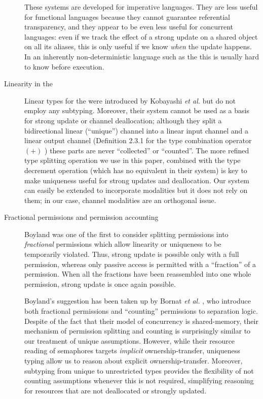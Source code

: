 \documentclass[copyright]{eptcs}
\begin{document}
\begin{description}
These systems are developed for imperative languages. They are less useful for
functional languages because they cannot guarantee referential transparency,
and they appear to be even less useful for concurrent languages: even if we track the effect
of a strong update on a shared object on all its aliases, this is only useful
if we know \textit{when} the update happens. In an inherently non-deterministic
language such as the \pic this is usually hard to know before execution. 

\item[Linearity in the \pic]

Linear types for the \pic were introduced by Kobayashi \textit{et al.}
\cite{KobayashiPT:linearity} but do not employ any subtyping.  Moreover, their
system cannot be used as a basis for strong update or channel deallocation;
although they  split a bidirectional linear (``unique'') channel into
a linear input channel and a linear output channel (\cf Definition 2.3.1 for the
type combination operator $(+)$ ) these parts are never
``collected'' or ``counted''. The more refined type splitting operation we use in this paper,
combined with the type decrement operation (which has no equivalent in their
system) is key to make uniqueness useful for strong updates and deallocation.
Our system can easily be extended to incorporate modalities but it does not
rely on them; in our case, channel modalities are an orthogonal issue.

\item[Fractional permissions and permission accounting]

Boyland \cite{boyland:03fractions} was one of the first to consider splitting
permissions into \textit{fractional} permissions which allow linearity or
uniqueness to be temporarily violated. Thus, strong update is possible only
with a full permission, whereas only passive access is permitted with a
``fraction'' of a permission.  When all the fractions have been reassembled
into one whole permission, strong update is once again possible.

Boyland's suggestion has been taken up by Bornat \textit{et al.}
\cite{Bornat:05Separation}, who introduce both fractional permissions and
``counting'' permissions to separation logic. Despite of the fact that their
model of concurrency is shared-memory,  their mechanism of permission splitting
and counting is surprisingly similar to our treatment of unique assumptions.
However, while their resource reading of semaphores targets \emph{implicit}
ownership-transfer, uniqueness typing allow us to reason about explicit
ownership-transfer. Moreover, subtyping from unique to unrestricted types
provides the flexibility of not counting assumptions whenever this is not
required, simplifying reasoning for resources that are not deallocated or
strongly updated. 


\end{description}
\end{document}
